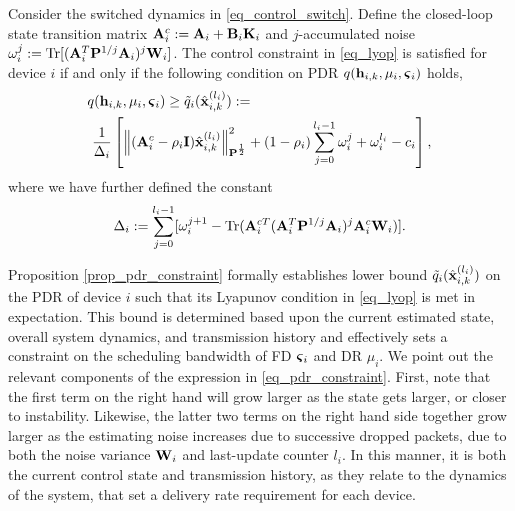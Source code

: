 \begin{proposition}\label{prop_pdr_constraint}
Consider the switched dynamics in \eqref{eq_control_switch}. Define the closed-loop state transition matrix ${\mathbf A}^c_i := {\mathbf A}_i + {\mathbf B}_i {\mathbf K}_i$ and $j$-accumulated noise $\omega_i^j := \text{Tr}[({\mathbf A}_i^T{\mathbf P}^{1/j} {\mathbf A}_i)^{j} {\mathbf W}_i]$. The control constraint in \eqref{eq_lyop} is satisfied for device $i$ if and only if the following condition on PDR $q({\mathbf h}_{i,k},\mu_i,\boldsymbol{\varsigma}_i)$ holds, 
%
\begin{align}\label{eq_pdr_constraint}
&q({\mathbf h}_{i,k},\mu_i,\boldsymbol{\varsigma}_i) \geq {\ensuremath{\tilde q}}_i({\hat{\mathbf x} }^{(l_i)}_{i,k}) :=  \\ &\ \frac{1}{\Delta_i} \left[  \left\| ({\mathbf A}^c_i - \rho_i{\mathbf I}){\hat{\mathbf x} }^{(l_i)}_{i,k} \right\|_{{\mathbf P}^{\frac{1}{2}}}^2+ (1-\rho_i)\sum_{j=0}^{l_i-1} \omega_i^j + \omega_i^{l_i} - c_i  \right],  \nonumber
\end{align}
%
where we have further defined the constant
%
\begin{equation}\label{eq_noise_diff}
\Delta_i :=  \sum_{j=0}^{l_i-1}[\omega^{j+1}_i - \text{Tr}({\mathbf A}^{cT}_i ({\mathbf A}_i^T{\mathbf P}^{1/j}{\mathbf A}_i)^j {\mathbf A}^c_i{\mathbf W}_i)  ].
\end{equation}
\end{proposition}
%

Proposition \ref{prop_pdr_constraint} formally establishes lower bound ${\tilde q}_i({\hat{\mathbf x} }^{(l_i)}_{i,k})$ on the PDR of device $i$ such that its Lyapunov condition in \eqref{eq_lyop} is met in expectation. This bound is determined based upon the current estimated state, overall system dynamics, and transmission history and effectively sets a constraint on the scheduling bandwidth of FD $\boldsymbol{\varsigma}_i$ and DR $\mu_i$. We point out the relevant components of the expression in \eqref{eq_pdr_constraint}. First, note that the first term on the right hand will grow larger as the state gets larger, or closer to instability. Likewise, the latter two terms on the right hand side together grow larger as the estimating noise increases due to successive dropped packets, due to both the noise variance ${\mathbf W}_i$ and last-update counter $l_i$. In this manner, it is both the current control state and transmission history, as they relate to the dynamics of the system, that set a delivery rate requirement for each device.

